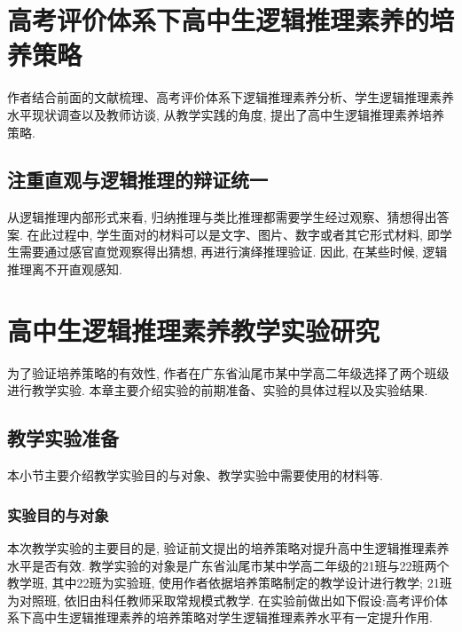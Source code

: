 \documentclass[acaddeg]{Style/SCNUThesisV3}
\begin{document}
\chapter{高考评价体系下高中生逻辑推理素养的培养策略}\label{Cha: 5}
\setcounter{equation}{0}
作者结合前面的文献梳理、高考评价体系下逻辑推理素养分析、学生逻辑推理素养水平现状调查以及教师访谈, 从教学实践的角度, 提出了高中生逻辑推理素养培养策略. 


\section{注重直观与逻辑推理的辩证统一}

从逻辑推理内部形式来看, 归纳推理与类比推理都需要学生经过观察、猜想得出答案. 在此过程中, 学生面对的材料可以是文字、图片、数字或者其它形式材料, 即学生需要通过感官直觉观察得出猜想, 再进行演绎推理验证. 因此, 在某些时候, 逻辑推理离不开直观感知.

 

\chapter{高中生逻辑推理素养教学实验研究}\label{Cha: 6}
\setcounter{equation}{0}
为了验证培养策略的有效性, 作者在广东省汕尾市某中学高二年级选择了两个班级进行教学实验. 本章主要介绍实验的前期准备、实验的具体过程以及实验结果.
\section{教学实验准备}
本小节主要介绍教学实验目的与对象、教学实验中需要使用的材料等.

\subsection{实验目的与对象}
本次教学实验的主要目的是, 验证前文提出的培养策略对提升高中生逻辑推理素养水平是否有效. 教学实验的对象是广东省汕尾市某中学高二年级的21班与22班两个教学班, 其中22班为实验班, 使用作者依据培养策略制定的教学设计进行教学; 21班为对照班, 依旧由科任教师采取常规模式教学. 在实验前做出如下假设:高考评价体系下高中生逻辑推理素养的培养策略对学生逻辑推理素养水平有一定提升作用.

 


\end{document}
